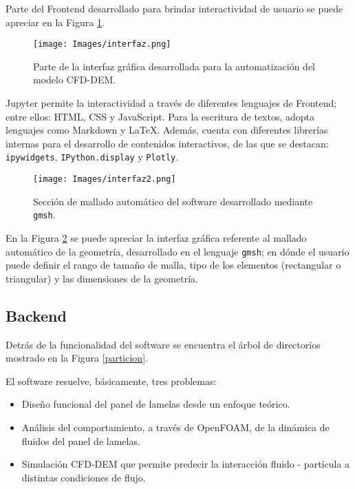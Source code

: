 \noindent
\justify

Parte del Frontend desarrollado para brindar interactividad de usuario se puede apreciar en la Figura \ref{interfaz}.

\begin{figure}[h!]
	\centering
	\texttt{[image: Images/interfaz.png]}
	\caption{Parte de la interfaz gr\'afica desarrollada para la automatizaci\'on del modelo CFD-DEM.}
	\label{interfaz}
\end{figure}

\noindent
\justify


Jupyter permite la interactividad a trav\'es de diferentes lenguajes de Frontend; entre ellos: HTML, CSS y JavaScript. Para la escritura de textos, adopta lenguajes como Markdown y \LaTeX. Adem\'as, cuenta con diferentes librer\'ias internas para el desarrollo de contenidos interactivos, de las que se destacan: \texttt{ipywidgets}, \texttt{IPython.display} y \texttt{Plotly}. 

\begin{figure}[h!]
	\centering
	\texttt{[image: Images/interfaz2.png]}
	\caption{Secci\'on de mallado autom\'atico del software desarrollado mediante \texttt{gmsh}.}
	\label{mallado:gmsh}
\end{figure}

\noindent
\justify

En la Figura \ref{mallado:gmsh} se puede apreciar la interfaz gr\'afica referente al mallado autom\'atico de la geometr\'ia, desarrollado en el lenguaje \texttt{gmsh}; en d\'onde el usuario puede definir el rango de tama\~no de malla, tipo de los elementos (rectangular o triangular) y las dimensiones de la geometr\'ia.

\newpage

\subsection{Backend}

\noindent
\justify

Detr\'as de la funcionalidad del software se encuentra el \'arbol de directorios mostrado en la Figura \ref{particion}.



\newpage

\noindent
\justify

El software resuelve, b\'asicamente, tres problemas:

\begin{itemize}
	\item Dise\~no funcional del panel de lamelas desde un enfoque te\'orico.
	\item An\'alisis del comportamiento, a trav\'es de OpenFOAM, de la din\'amica de fluidos del panel de lamelas.
	\item Simulaci\'on CFD-DEM que permite predecir la interacci\'on fluido - part\'icula a distintas condiciones de flujo.
\end{itemize}

